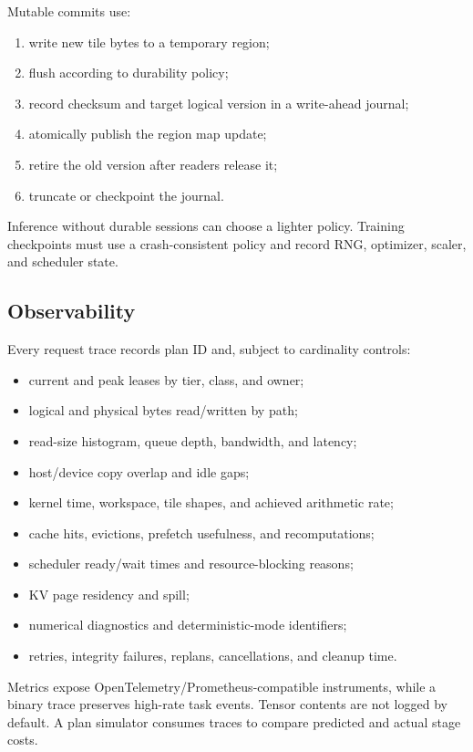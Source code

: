 Mutable commits use:

\begin{enumerate}
  \item write new tile bytes to a temporary region;
  \item flush according to durability policy;
  \item record checksum and target logical version in a write-ahead journal;
  \item atomically publish the region map update;
  \item retire the old version after readers release it;
  \item truncate or checkpoint the journal.
\end{enumerate}

Inference without durable sessions can choose a lighter policy. Training checkpoints must use a crash-consistent policy and record RNG, optimizer, scaler, and scheduler state.

\subsection{Observability}

Every request trace records plan ID and, subject to cardinality controls:

\begin{itemize}
  \item current and peak leases by tier, class, and owner;
  \item logical and physical bytes read/written by path;
  \item read-size histogram, queue depth, bandwidth, and latency;
  \item host/device copy overlap and idle gaps;
  \item kernel time, workspace, tile shapes, and achieved arithmetic rate;
  \item cache hits, evictions, prefetch usefulness, and recomputations;
  \item scheduler ready/wait times and resource-blocking reasons;
  \item KV page residency and spill;
  \item numerical diagnostics and deterministic-mode identifiers;
  \item retries, integrity failures, replans, cancellations, and cleanup time.
\end{itemize}

Metrics expose OpenTelemetry/Prometheus-compatible instruments, while a binary trace preserves high-rate task events. Tensor contents are not logged by default. A plan simulator consumes traces to compare predicted and actual stage costs.
